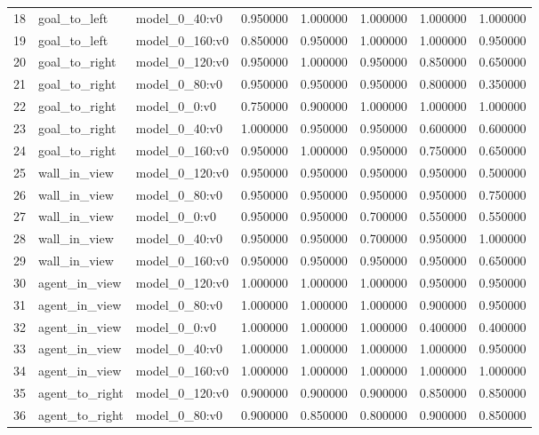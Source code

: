 \begin{tabular}{lllrrrrr}
18 & goal\_to\_left & model\_0\_40:v0 & 0.950000 & 1.000000 & 1.000000 & 1.000000 & 1.000000 \\
19 & goal\_to\_left & model\_0\_160:v0 & 0.850000 & 0.950000 & 1.000000 & 1.000000 & 0.950000 \\
20 & goal\_to\_right & model\_0\_120:v0 & 0.950000 & 1.000000 & 0.950000 & 0.850000 & 0.650000 \\
21 & goal\_to\_right & model\_0\_80:v0 & 0.950000 & 0.950000 & 0.950000 & 0.800000 & 0.350000 \\
22 & goal\_to\_right & model\_0\_0:v0 & 0.750000 & 0.900000 & 1.000000 & 1.000000 & 1.000000 \\
23 & goal\_to\_right & model\_0\_40:v0 & 1.000000 & 0.950000 & 0.950000 & 0.600000 & 0.600000 \\
24 & goal\_to\_right & model\_0\_160:v0 & 0.950000 & 1.000000 & 0.950000 & 0.750000 & 0.650000 \\
25 & wall\_in\_view & model\_0\_120:v0 & 0.950000 & 0.950000 & 0.950000 & 0.950000 & 0.500000 \\
26 & wall\_in\_view & model\_0\_80:v0 & 0.950000 & 0.950000 & 0.950000 & 0.950000 & 0.750000 \\
27 & wall\_in\_view & model\_0\_0:v0 & 0.950000 & 0.950000 & 0.700000 & 0.550000 & 0.550000 \\
28 & wall\_in\_view & model\_0\_40:v0 & 0.950000 & 0.950000 & 0.700000 & 0.950000 & 1.000000 \\
29 & wall\_in\_view & model\_0\_160:v0 & 0.950000 & 0.950000 & 0.950000 & 0.950000 & 0.650000 \\
30 & agent\_in\_view & model\_0\_120:v0 & 1.000000 & 1.000000 & 1.000000 & 0.950000 & 0.950000 \\
31 & agent\_in\_view & model\_0\_80:v0 & 1.000000 & 1.000000 & 1.000000 & 0.900000 & 0.950000 \\
32 & agent\_in\_view & model\_0\_0:v0 & 1.000000 & 1.000000 & 1.000000 & 0.400000 & 0.400000 \\
33 & agent\_in\_view & model\_0\_40:v0 & 1.000000 & 1.000000 & 1.000000 & 1.000000 & 0.950000 \\
34 & agent\_in\_view & model\_0\_160:v0 & 1.000000 & 1.000000 & 1.000000 & 1.000000 & 1.000000 \\
35 & agent\_to\_right & model\_0\_120:v0 & 0.900000 & 0.900000 & 0.900000 & 0.850000 & 0.850000 \\
36 & agent\_to\_right & model\_0\_80:v0 & 0.900000 & 0.850000 & 0.800000 & 0.900000 & 0.850000 \\

\end{tabular}

